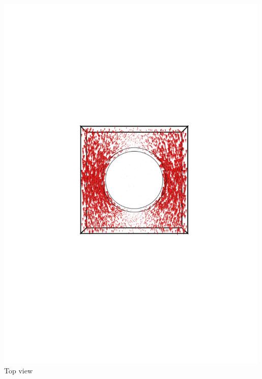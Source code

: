 \documentclass[compress]{beamer}
\begin{document}
\begin{frame}
\begin{columns}[totalwidth=\textwidth]
\begin{column}{.35\textwidth}
   \includegraphics[width=0.99\textwidth]{Graphic/04_magnecylinb1_xyview.pdf}
   Top view
   \end{column}
\end{columns}
\end{frame}
\end{document}
